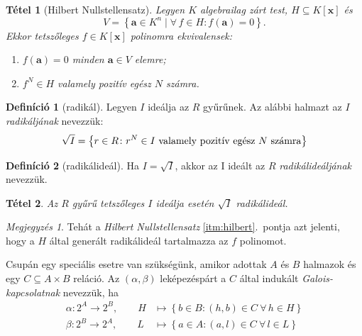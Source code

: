 \documentclass[DIV=15,appendixprefix]{scrreprt}
\newtheorem*{tetel}{Tétel}
\theoremstyle{definition}
\newtheorem*{defin}{Definíció}
\theoremstyle{remark}
\newtheorem*{megj}{Megjegyzés}
\begin{document}
\begin{tetel}[Hilbert Nullstellensatz]
	Legyen $ K $ algebrailag zárt test, $ H \subseteq K \left[ \mathbf{ x } \right] $ és
	\begin{equation*}
		V = \left\{ \mathbf{ a } \in K^{ n } \mid \forall\,f \in H \colon f \left( \mathbf{ a }
		\right) = 0 \right\}.
	\end{equation*}
	Ekkor tetszőleges $ f \in K \left[ \mathbf{ x } \right] $ polinomra ekvivalensek:
	\begin{enumerate}
		\item $f \left( \mathbf{ a } \right) = 0$ minden $ \mathbf{ a } \in V $ elemre;
		\item\label{itm:hilbert} $f^{ N } \in H $ valamely pozitív egész $ N $ számra.
	\end{enumerate}
\end{tetel}
%
\begin{defin}[radikál]
	Legyen $ I $ ideálja az $ R $ gyűrűnek. Az alábbi halmazt az $ I $ \emph{radikáljának} nevezzük:
	\begin{equation*}
		\sqrt{ I } = \left\{ r \in R \colon r^N \in I\text{ valamely pozitív egész $ N $ számra}
		\right\}
	\end{equation*}
\end{defin}
\begin{defin}[radikálideál]
	Ha $ I = \sqrt{ I }$, akkor az I ideált az $ R $ \emph{radikálideáljának} nevezzük.
\end{defin}
\begin{tetel}
	Az $ R $ gyűrű tetszőleges $ I $ ideálja esetén $ \sqrt{ I } $ radikálideál.
\end{tetel}
\begin{megj}
	Tehát a \emph{Hilbert Nullstellensatz} \ref{itm:hilbert}.~pontja azt jelenti, hogy a $ H $ által
	generált radikálideál tartalmazza az $ f $ polinomot.
\end{megj}
%
Csupán egy speciális esetre van szükségünk, amikor adottak $ A $ és $ B $ halmazok és egy
$ C \subseteq A \times B $ reláció. Az $ \left( \alpha,{} \beta \right) $ leképezéspárt a $ C $
által indukált \emph{Galois-kapcsolatnak} nevezzük, ha
\begin{align*}
	\alpha \colon 2^{ A } \rightarrow 2^{ B }, \qquad H &\mapsto \left\{ b \in B \colon \left( h,{}
	b \right) \in C \  \forall\, h \in H \right\}\\
	\beta \colon 2^{ B } \rightarrow 2^{ A }, \qquad L &\mapsto \left\{ a \in A \colon \left( a,{}
	l \right) \in C \  \forall\, l \in L \right\}
\end{align*}
\end{document}
